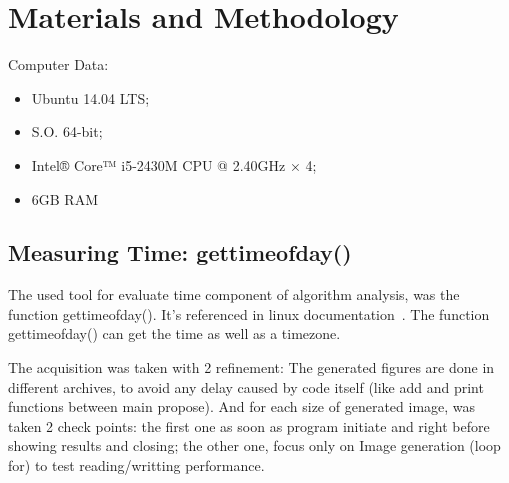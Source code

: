 \section{Materials and Methodology}\label{sec:3}

Computer Data:
  \begin{itemize}
  \item Ubuntu 14.04 LTS;
  \item S.O. 64-bit;
  \item Intel® Core™ i5-2430M CPU @ 2.40GHz × 4;
  \item 6GB RAM
  \end{itemize}

\subsection{Measuring Time: gettimeofday()}
        The used tool for evaluate time component of algorithm analysis, was the function gettimeofday(). It's referenced in linux documentation~\cite{Linux.die}. The function gettimeofday() can get the time as well as a timezone.

        The acquisition was taken with 2 refinement: The generated figures are done in different archives, to avoid any delay caused by code itself (like add and print functions between main propose).
        And for each size of generated image, was taken 2 check points: the first one as soon as program initiate and right before showing results and closing; the other one, focus only on Image generation (loop for) to test reading/writting performance. 


